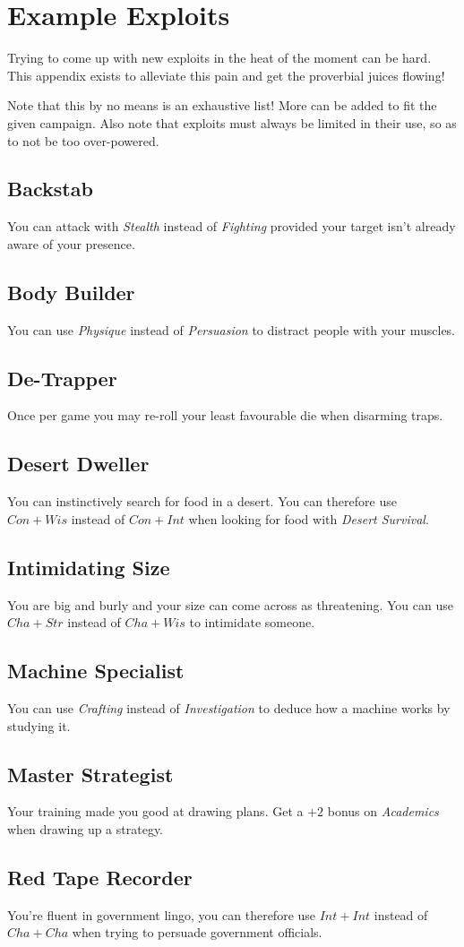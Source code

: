 \chapter{Example Exploits}\label{app:exploits}
Trying to come up with new exploits in the heat of the moment can be hard.
This appendix exists to alleviate this pain and get the proverbial juices flowing!

Note that this by no means is an exhaustive list!
More can be added to fit the given campaign.
Also note that exploits must always be limited in their use, so as to not be too over-powered.

\section{Backstab}
You can attack with \textit{Stealth} instead of \textit{Fighting} provided your target isn't already aware of your presence.

\section{Body Builder}
You can use \textit{Physique} instead of \textit{Persuasion} to distract people with your muscles.

\section{De-Trapper}
Once per game you may re-roll your least favourable die when disarming traps.

\section{Desert Dweller}
You can instinctively search for food in a desert.
You can therefore use $Con + Wis$ instead of $Con + Int$ when looking for food with \textit{Desert Survival}.

\section{Intimidating Size}
You are big and burly and your size can come across as threatening.
You can use $Cha + Str$ instead of $Cha + Wis$ to intimidate someone.

\section{Machine Specialist}
You can use \textit{Crafting} instead of \textit{Investigation} to deduce how a machine works by studying it.

\section{Master Strategist}
Your training made you good at drawing plans.
Get a $+2$ bonus on \textit{Academics} when drawing up a strategy.

\section{Red Tape Recorder}
You're fluent in government lingo, you can therefore use $Int + Int$ instead of $Cha + Cha$ when trying to persuade government officials.